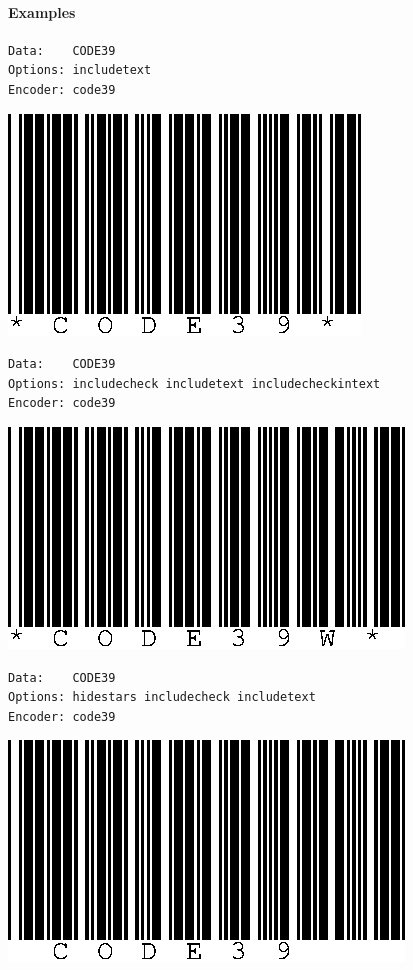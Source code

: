 \hypertarget{examples-15}{%
\paragraph{Examples}\label{examples-15}}

\begin{verbatim}
Data:    CODE39
Options: includetext
Encoder: code39
\end{verbatim}

\includegraphics{images/code39-1.eps}

\begin{verbatim}
Data:    CODE39
Options: includecheck includetext includecheckintext
Encoder: code39
\end{verbatim}

\includegraphics{images/code39-2.eps}

\begin{verbatim}
Data:    CODE39
Options: hidestars includecheck includetext
Encoder: code39
\end{verbatim}

\includegraphics{images/code39-3.eps}

